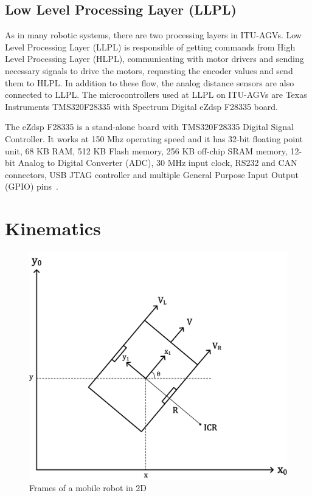 \subsection{Low Level Processing Layer (LLPL)}
\label{subsec:llpl}
As in many robotic systems, there are two processing layers in ITU-AGVs. Low Level Processing Layer (LLPL) is responsible of getting commands from High Level Processing Layer (HLPL), communicating with motor drivers and sending necessary signals to drive the motors, requesting the encoder values and send them to HLPL. In addition to these flow, the analog distance sensors are also connected to LLPL. The microcontrollers used at LLPL on ITU-AGVs are Texas Instruments TMS320F28335 with Spectrum Digital eZdsp F28335 board. 
\par
The eZdsp F28335 is a stand-alone board with TMS320F28335 Digital Signal Controller. It works at 150 Mhz operating speed and it has 32-bit floating point unit, 68 KB RAM, 512 KB Flash memory, 256 KB off-chip SRAM memory, 12-bit Analog to Digital Converter (ADC), 30 MHz input clock, RS232 and CAN connectors, USB JTAG controller and multiple General Purpose Input Output (GPIO) pins~\cite{ezdspDatasheet}.


\section{Kinematics}
\label{sec:kinematics}
\begin{figure}
	\centering
	\includegraphics[scale=0.9]{images/kinematics_fig}
	\caption{Frames of a mobile robot in 2D}
	\label{fig:kinematics}
\end{figure}

